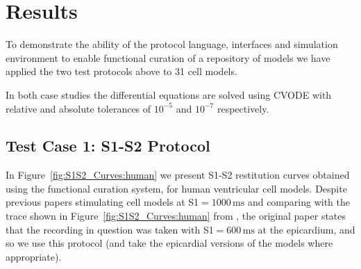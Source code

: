 \documentclass[preprint,authoryear,12pt]{elsarticle}
\newcommand{\vu}[2]{\ensuremath{#1\,\mathrm{#2}}}
\newcommand{\authornote}[2]{{\bf [#1: #2]}}
\newcommand{\gary}[1]{\authornote{Gary}{#1}}
\newcommand{\changed}[1]{#1}
\begin{document}
\section{Results}
\label{sec:results}

To demonstrate the ability of the protocol language, interfaces and
simulation environment to enable functional curation of a repository of
models we have applied the two test protocols above to 31 cell models.


In both case studies the differential equations are solved using CVODE \citep{hindmarsh2005sundials} with relative and absolute tolerances of $10^{-5}$ and $10^{-7}$ respectively.

\subsection{Test Case 1: S1-S2 Protocol}
\label{sec:results-s1s2}

In Figure~\ref{fig:S1S2_Curves:human} we present S1-S2 restitution curves obtained using the functional curation system, for human ventricular cell models.
Despite previous papers stimulating cell models at S1$=\vu{1000}{ms}$ and comparing with the trace shown in Figure~\ref{fig:S1S2_Curves:human} from \citet{morgan1992},
the original paper states that the recording in question was taken with S1$=\vu{600}{ms}$ at the epicardium, and so we use this protocol (and take the epicardial versions
of the models where appropriate). 
\end{document}
